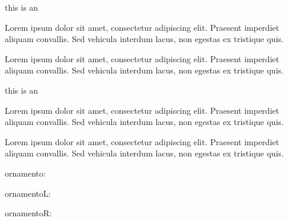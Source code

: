 \documentclass[a4paper]{scrartcl}
\begin{document}


this is an 


Lorem ipsum dolor sit amet, consectetur adipiscing elit. Praesent imperdiet aliquam convallis. Sed vehicula interdum lacus, non egestas ex tristique quis.


Lorem ipsum dolor sit amet, consectetur adipiscing elit. Praesent imperdiet aliquam convallis. Sed vehicula interdum lacus, non egestas ex tristique quis.


this is an 


Lorem ipsum dolor sit amet, consectetur adipiscing elit. Praesent imperdiet aliquam convallis. Sed vehicula interdum lacus, non egestas ex tristique quis.




Lorem ipsum dolor sit amet, consectetur adipiscing elit. Praesent imperdiet aliquam convallis. Sed vehicula interdum lacus, non egestas ex tristique quis.

ornamento:

\ornamento

ornamentoL:

\ornamentoLD

ornamentoR:

\ornamentoRD
\end{document}
